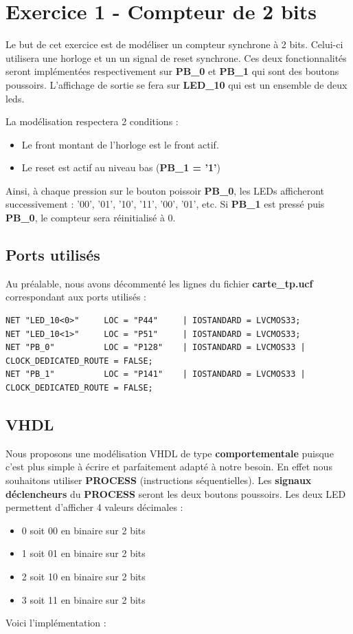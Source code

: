 \section{Exercice 1 - Compteur de 2 bits}

Le but de cet exercice est de modéliser un compteur synchrone à 2 bits. Celui-ci utilisera une horloge et un un signal de reset synchrone. Ces deux fonctionnalités seront implémentées respectivement sur \textbf{PB\_0} et \textbf{PB\_1} qui sont des boutons poussoirs. L'affichage de sortie se fera sur \textbf{LED\_10} qui est un ensemble de deux leds.

\medskip

\noindent La modélisation respectera 2 conditions :
\begin{itemize}
  \item Le front montant de l’horloge est le front actif.
  \item Le reset est actif au niveau bas (\textbf{PB\_1 = '1'})
\end{itemize}
Ainsi, à chaque pression sur le bouton poissoir \textbf{PB\_0}, les LEDs afficheront successivement : '00', '01', '10', '11', '00', '01', etc. Si \textbf{PB\_1} est pressé puis \textbf{PB\_0}, le compteur sera réinitialisé à 0.

\subsection{Ports utilisés}

Au préalable, nous avons décommenté les lignes du fichier \textbf{carte\_tp.ucf} correspondant aux ports utilisés :
\begin{lstlisting}
NET "LED_10<0>"     LOC = "P44"     | IOSTANDARD = LVCMOS33;
NET "LED_10<1>"     LOC = "P51"     | IOSTANDARD = LVCMOS33;
NET "PB_0"          LOC = "P128"    | IOSTANDARD = LVCMOS33 | CLOCK_DEDICATED_ROUTE = FALSE;
NET "PB_1"          LOC = "P141"    | IOSTANDARD = LVCMOS33 | CLOCK_DEDICATED_ROUTE = FALSE;
\end{lstlisting}

\subsection{VHDL}

Nous proposons une modélisation VHDL de type \textbf{comportementale} puisque c'est plus simple à écrire et parfaitement adapté à notre besoin. En effet nous souhaitons utiliser \textbf{PROCESS} (instructions séquentielles). Les \textbf{signaux déclencheurs} du \textbf{PROCESS} seront les deux boutons poussoirs. Les deux LED permettent \og d'afficher\fg{} 4 valeurs décimales :
\begin{itemize}
  \item 0 soit 00 en binaire sur 2 bits
  \item 1 soit 01 en binaire sur 2 bits
  \item 2 soit 10 en binaire sur 2 bits
  \item 3 soit 11 en binaire sur 2 bits
\end{itemize}
Voici l'implémentation :


